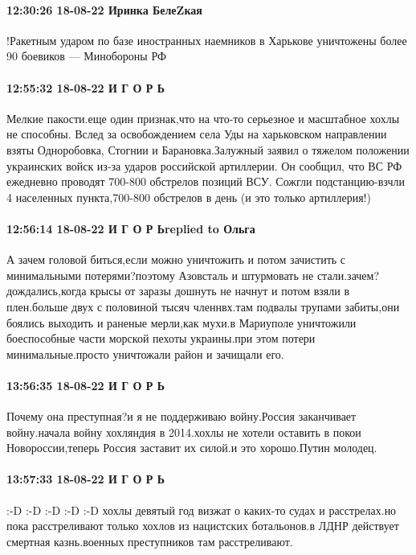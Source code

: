 \paragraph{12:30:26 18-08-22 Иринка БелеZкая}

!Ракетным ударом по базе иностранных наемников в Харькове уничтожены более 90
боевиков — Минобороны РФ

\paragraph{12:55:32 18-08-22 И Г О Р Ь}

Мелкие пакости.еще один признак,что на что-то серьезное и масштабное хохлы не
способны. Вслед за освобождением села Уды на харьковском направлении взяты
Одноробовка, Стогнии и Барановка.Залужный заявил о тяжелом положении украинских
войск из-за ударов российской артиллерии. Он сообщил, что ВС РФ ежедневно
проводят 700-800 обстрелов позиций ВСУ. Сожгли подстанцию-взчли 4 населенных
пункта,700-800 обстрелов в день (и это только артиллерия!)

\paragraph{12:56:14 18-08-22 И Г О Р Ьreplied to Ольга}

А зачем головой биться,если можно уничтожить и потом зачистить с минимальными
потерями?поэтому Азовсталь и штурмовать не стали.зачем?дождались,когда крысы от
заразы дошнуть не начнут и потом взяли в плен.больше двух с половиной тысяч
членнвх.там подвалы трупами забиты,они боялись выходить и раненые мерли,как
мухи.в Мариуполе уничтожили боеспособные части морской пехоты украины.при этом
потери минимальные.просто уничтожали район и зачищали его.

\paragraph{13:56:35 18-08-22 И Г О Р Ь}

Почему она преступная?и я не поддерживаю войну.Россия заканчивает войну.начала
войну хохляндия в 2014.хохлы не хотели оставить в покои Новороссии,теперь
Россия заставит их силой.и это хорошо.Путин молодец.

\paragraph{13:57:33 18-08-22 И Г О Р Ь}

:-D :-D :-D :-D :-D хохлы девятый год визжат о каких-то судах и расстрелах.но
пока расстреливают только хохлов из нацистских ботальонов.в ЛДНР действует
смертная казнь.военных преступников там расстреливают.

